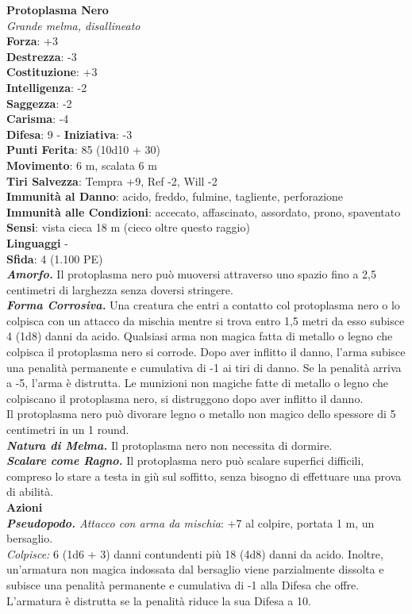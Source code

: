 \begin{multicols}{2}
\medskip\textbf{Protoplasma Nero}\\
\emph{Grande melma, disallineato}\\
\textbf{Forza}: +3\\
\textbf{Destrezza}: -3\\
\textbf{Costituzione}: +3\\
\textbf{Intelligenza}: -2\\
\textbf{Saggezza}: -2\\
\textbf{Carisma}: -4\\
\textbf{Difesa}: 9 - \textbf{Iniziativa}: -3\\
\textbf{Punti Ferita}: 85 (10d10 + 30)\\
\textbf{Movimento}: 6 m, scalata 6 m\\
\textbf{Tiri Salvezza}: Tempra +9, Ref -2, Will -2\\
\textbf{Immunità al Danno}: acido, freddo, fulmine, tagliente, perforazione\\
\textbf{Immunità alle Condizioni}: accecato, affascinato, assordato, prono, spaventato
\textbf{Sensi}: vista cieca 18 m (cieco oltre questo raggio)\\
\textbf{Linguaggi} -\\
\textbf{Sfida}: 4 (1.100 PE)\smallskip\\
\emph{\textbf{Amorfo.}} Il protoplasma nero può muoversi attraverso uno spazio fino a 2,5 centimetri di larghezza senza doversi stringere.\\
\emph{\textbf{Forma Corrosiva.}} Una creatura che entri a contatto col protoplasma nero o lo colpisca con un attacco da mischia mentre si trova entro 1,5 metri da esso subisce 4 (1d8) danni da acido. Qualsiasi arma non magica fatta di metallo o legno che colpisca il protoplasma nero si corrode. Dopo aver inflitto il danno, l'arma subisce una penalità permanente e cumulativa di -1 ai tiri di danno. Se la penalità arriva a -5, l'arma è distrutta. Le munizioni non magiche fatte di metallo o legno che colpiscano il protoplasma nero, si distruggono dopo aver inflitto il danno. \\
Il protoplasma nero può divorare legno o metallo non magico dello spessore di 5 centimetri in un 1 round.\\
\emph{\textbf{Natura di Melma.}} Il protoplasma nero non necessita di dormire.\\
\emph{\textbf{Scalare come Ragno.}} Il protoplasma nero può scalare superfici difficili, compreso lo stare a testa in giù sul soffitto, senza bisogno di effettuare una prova di abilità.\\
\smallskip\textbf{Azioni}\\
\emph{\textbf{Pseudopodo.} Attacco con arma da mischia}: +7 al colpire, portata 1 m, un bersaglio.\\
\emph{Colpisce:} 6 (1d6 + 3) danni contundenti più 18 (4d8) danni da acido. Inoltre, un'armatura non magica indossata dal bersaglio viene parzialmente dissolta e subisce una penalità permanente e cumulativa di -1 alla Difesa che offre. L'armatura è distrutta se la penalità riduce la sua Difesa a 10.\\


\end{multicols}
